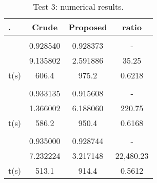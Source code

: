\documentclass[a4paper]{article}
\begin{document}
\begin{table}
\begin{center} \small
\begin{tabular}{ | l | c | c | c | }
\hline
. & Crude &  Proposed &  ratio \\ \hline \hline
 \\ \hline \hline
\quad  &  0.928540  &  0.928373  &  - \\ \hline
\quad  & 9.135802 & 2.591886 & 35.25 \\ \hline
\quad t(s) & 606.4 &  975.2  & 0.6218 \\ \hline
 \\ \hline \hline
\quad  &  0.933135  &  0.915608  &  - \\ \hline
\quad  & 1.366002 & 6.188060 & 220.75 \\ \hline
\quad t(s) & 586.2 &  950.4  & 0.6168 \\ \hline
 \\ \hline \hline
\quad  &  0.935000  &  0.928744  &  - \\ \hline
\quad  & 7.232224 & 3.217148 & 22,480.23 \\ \hline
\quad t(s) & 513.1 &  914.4  & 0.5612 \\ \hline
\end{tabular}
\end{center}
\caption{Test 3: numerical results.}
\label{tab:results-case-3}
\end{table}
\end{document}
